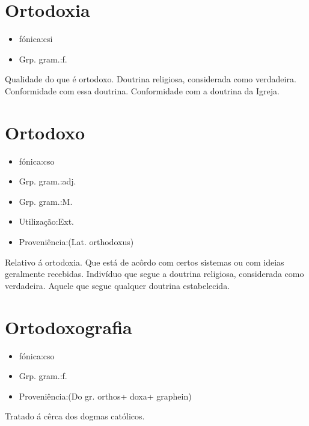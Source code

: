 \section{Ortodoxia}
\begin{itemize}
\item {fónica:csi}
\end{itemize}
\begin{itemize}
\item {Grp. gram.:f.}
\end{itemize}
Qualidade do que é ortodoxo.
Doutrina religiosa, considerada como verdadeira.
Conformidade com essa doutrina.
Conformidade com a doutrina da Igreja.
\section{Ortodoxo}
\begin{itemize}
\item {fónica:cso}
\end{itemize}
\begin{itemize}
\item {Grp. gram.:adj.}
\end{itemize}
\begin{itemize}
\item {Grp. gram.:M.}
\end{itemize}
\begin{itemize}
\item {Utilização:Ext.}
\end{itemize}
\begin{itemize}
\item {Proveniência:(Lat. \textunderscore orthodoxus\textunderscore )}
\end{itemize}
Relativo á ortodoxia.
Que está de acôrdo com certos sistemas ou com ideias geralmente recebidas.
Indivíduo que segue a doutrina religiosa, considerada como verdadeira.
Aquele que segue qualquer doutrina estabelecida.
\section{Ortodoxografia}
\begin{itemize}
\item {fónica:cso}
\end{itemize}
\begin{itemize}
\item {Grp. gram.:f.}
\end{itemize}
\begin{itemize}
\item {Proveniência:(Do gr. \textunderscore orthos\textunderscore  + \textunderscore doxa\textunderscore  + \textunderscore graphein\textunderscore )}
\end{itemize}
Tratado á cêrca dos dogmas católicos.
